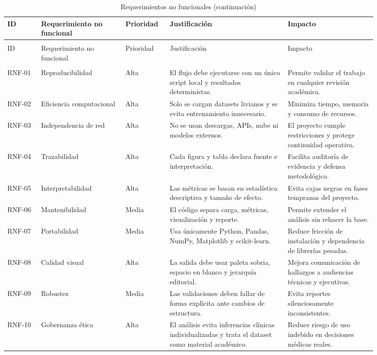 \documentclass[11pt,a4paper]{article}
\begin{document}
\begin{landscape}

\scriptsize
\setlength{\tabcolsep}{1.5pt}
\renewcommand{\arraystretch}{1.16}
\begin{longtable}{>{\raggedright\arraybackslash}p{0.084\linewidth} >{\raggedright\arraybackslash}p{0.206\linewidth} >{\raggedright\arraybackslash}p{0.094\linewidth} >{\raggedright\arraybackslash}p{0.281\linewidth} >{\raggedright\arraybackslash}p{0.215\linewidth}}
\caption{Requerimientos no funcionales}\label{tab:nonfunctional}\\
\toprule
ID & Requerimiento no funcional & Prioridad & Justificación & Impacto \\
\midrule
\endfirsthead
\caption[]{Requerimientos no funcionales (continuación)}\\
\toprule
ID & Requerimiento no funcional & Prioridad & Justificación & Impacto \\
\midrule
\endhead
\midrule
\multicolumn{5}{r}{Continúa en la siguiente página}\\
\midrule
\endfoot
\bottomrule
\endlastfoot
RNF-01 & Reproducibilidad & Alta & El flujo debe ejecutarse con un único script local y resultados deterministas. & Permite validar el trabajo en cualquier revisión académica. \\
RNF-02 & Eficiencia computacional & Alta & Solo se cargan datasets livianos y se evita entrenamiento innecesario. & Minimiza tiempo, memoria y consumo de recursos. \\
RNF-03 & Independencia de red & Alta & No se usan descargas, APIs, nube ni modelos externos. & El proyecto cumple restricciones y protege continuidad operativa. \\
RNF-04 & Trazabilidad & Alta & Cada figura y tabla declara fuente e interpretación. & Facilita auditoría de evidencia y defensa metodológica. \\
RNF-05 & Interpretabilidad & Alta & Las métricas se basan en estadística descriptiva y tamaño de efecto. & Evita cajas negras en fases tempranas del proyecto. \\
RNF-06 & Mantenibilidad & Media & El código separa carga, métricas, visualización y reporte. & Permite extender el análisis sin rehacer la base. \\
RNF-07 & Portabilidad & Media & Usa únicamente Python, Pandas, NumPy, Matplotlib y scikit-learn. & Reduce fricción de instalación y dependencia de librerías pesadas. \\
RNF-08 & Calidad visual & Alta & La salida debe usar paleta sobria, espacio en blanco y jerarquía editorial. & Mejora comunicación de hallazgos a audiencias técnicas y ejecutivas. \\
RNF-09 & Robustez & Media & Las validaciones deben fallar de forma explícita ante cambios de estructura. & Evita reportes silenciosamente inconsistentes. \\
RNF-10 & Gobernanza ética & Alta & El análisis evita inferencias clínicas individualizadas y trata el dataset como material académico. & Reduce riesgo de uso indebido en decisiones médicas reales. \\
\end{longtable}
\normalsize

\end{landscape}
\end{document}

